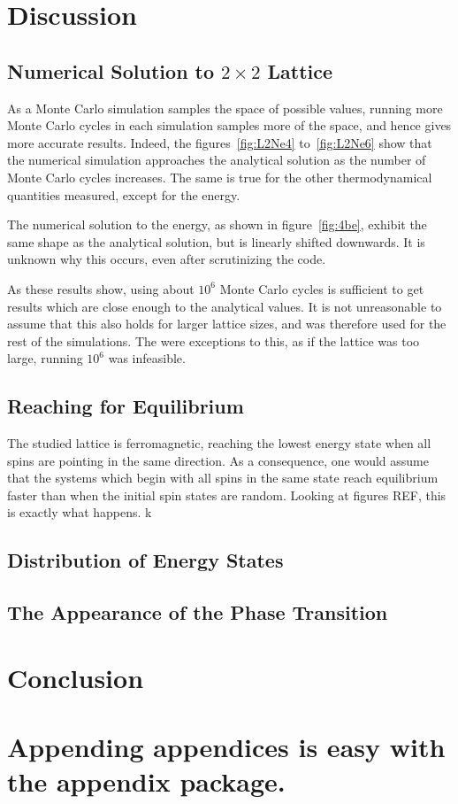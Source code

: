 \documentclass[aps,reprint]{revtex4-1}
\newcommand\blankpage{%
  \null
  \thispagestyle{empty}%
  \addtocounter{page}{-1}%
  \newpage}
\begin{document}
\section{Discussion}
\label{sec:discussion}

\subsection{Numerical Solution to $2\times 2$ Lattice}
As a Monte Carlo simulation samples the space of possible values, running more
Monte Carlo cycles in each simulation samples more of the space, and hence gives
more accurate results. Indeed, the figures~\ref{fig:L2Ne4} to~\ref{fig:L2Ne6}
show that the numerical simulation approaches the analytical solution as the
number of Monte Carlo cycles increases. The same is true for the other
thermodynamical quantities measured, except for the energy.

The numerical solution to the energy, as shown in figure~\ref{fig:4be}, exhibit
the same shape as the analytical solution, but is linearly shifted downwards. It
is unknown why this occurs, even after scrutinizing the code.

As these results show, using about \(10^{6}\) Monte Carlo cycles is sufficient
to get results which are close enough to the analytical values. It is not
unreasonable to assume that this also holds for larger lattice sizes, and was
therefore used for the rest of the simulations. The were exceptions to this, as
if the lattice was too large, running \(10^{6}\) was infeasible.

\subsection{Reaching for Equilibrium}
\label{sec:reaching-equilibrium-2}

The studied lattice is ferromagnetic, reaching the lowest energy state when all
spins are pointing in the same direction. As a consequence, one would assume
that the systems which begin with all spins in the same state reach equilibrium
faster than when the initial spin states are random. Looking at figures REF,
this is exactly what happens. k

\subsection{Distribution of Energy States}
\label{sec:distr-energy-stat-2}

\subsection{The Appearance of the Phase Transition}
\label{sec:appe-phase-trans-2}

\section{Conclusion}
\label{sec:conclusion}


\blankpage
\appendix
\section{Appending appendices is easy with the appendix package.}
\blankpage
\end{document}
